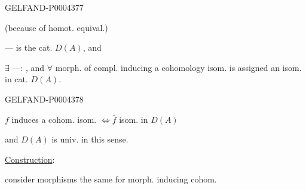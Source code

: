\begin{GelfandAdjacentEvidence}{GELFAND-P000437}{7}


(because of homot. equival.)

 — is the cat. $D(A)$, and

$\exists$ —: , and $\forall$ morph. of compl. inducing a cohomology isom. is assigned an isom. in cat. $D(A)$.
\end{GelfandAdjacentEvidence}
\begin{GelfandAdjacentEvidence}{GELFAND-P000437}{8}


$f$ induces a cohom. isom. $\boldsymbol{\Longleftrightarrow}\bar f$ isom. in $D(A)$
\end{GelfandAdjacentEvidence}


and $D(A)$ is univ. in this sense.

\underline{Construction}:

consider morphisms the same for morph. inducing cohom.


